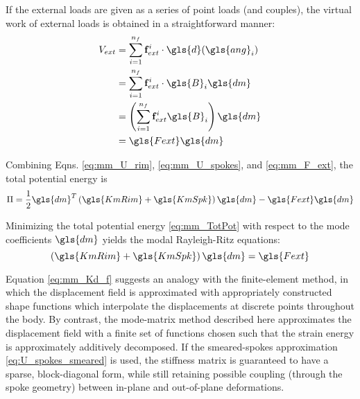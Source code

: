 \documentclass[\rootdir/thesis.tex]{subfiles}
\begin{document}
If the external loads are given as a series of point loads (and couples), the virtual work of external loads is obtained in a straightforward manner:
\begin{align}
\label{eq:mm_F_ext}
\begin{split}
V_{ext} &= \sum_{i=1}^{n_f} \mathbf{f}_{ext}^i \cdot \gls{d}(\gls{ang}_i) \\
&= \sum_{i=1}^{n_f} \mathbf{f}_{ext}^i \cdot \gls{B}_i \gls{dm}\\
&= \left(\sum_{i=1}^{n_f} \mathbf{f}_{ext}^i \gls{B}_i \right) \gls{dm}\\
&= \gls{Fext}\gls{dm}
\end{split}
\end{align}

Combining Eqns. \eqref{eq:mm_U_rim}, \eqref{eq:mm_U_spokes}, and \eqref{eq:mm_F_ext}, the total potential energy is
\begin{equation}
\label{eq:mm_TotPot}
\Pi = \frac{1}{2} \gls{dm}^T \left( \gls{KmRim} + \gls{KmSpk} \right) \gls{dm} - \gls{Fext}\gls{dm}
\end{equation}

Minimizing the total potential energy \eqref{eq:mm_TotPot} with respect to the mode coefficients $\gls{dm}$ yields the modal Rayleigh-Ritz equations:
\begin{equation}
\label{eq:mm_Kd_f}
\left( \gls{KmRim} + \gls{KmSpk} \right) \gls{dm} = \gls{Fext}
\end{equation}

Equation \eqref{eq:mm_Kd_f} suggests an analogy with the finite-element method, in which the displacement field is approximated with appropriately constructed shape functions which interpolate the displacements at discrete points throughout the body. By contrast, the mode-matrix method described here approximates the displacement field with a finite set of functions chosen such that the strain energy is approximately additively decomposed. If the smeared-spokes approximation \eqref{eq:U_spokes_smeared} is used, the stiffness matrix is guaranteed to have a sparse, block-diagonal form, while still retaining possible coupling (through the spoke geometry) between in-plane and out-of-plane deformations.
\end{document}
